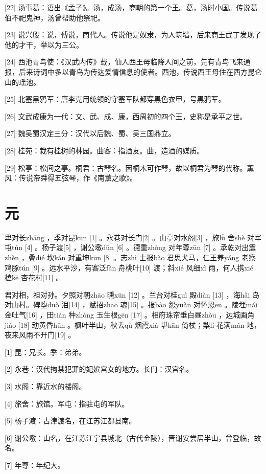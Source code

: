 \documentclass[12pt,UTF8]{ctexbook}
\begin{document}
[22] 汤事葛：语出《孟子》。汤，成汤，商朝的第一个王。葛，汤时小国。传说葛伯不祀鬼神，汤曾帮助他祭祀。

[23] 说兴殷：说，傅说，商代人。传说他是奴隶，为人筑墙，后来商王武丁发现了他的才干，举以为三公。

[24] 西池青鸟使：《汉武内传》载，仙人西王母临降人间之前，先有青鸟飞来通报，后来诗词中多以青鸟为传达爱情信息的使者。西池，传说西王母住在西方昆仑山的瑶池。

[25] 北塞黑鸦军：唐李克用统领的守塞军队都穿黑色衣甲，号黑鸦军。

[26] 文武成康为一代：文、武、成、康，西周初的四个王，史称是承平之世。

[27] 魏吴蜀汉定三分：汉代以后魏、蜀、吴三国鼎立。

[28] 桂苑：栽有桂树的林园。曲客：指酒友。曲，造酒的媒质。

[29] 松亭：松间之亭。桐君：古琴名。因桐木可作琴，故以桐君为琴的代称。薰风：传说帝舜得五弦琴，作《南薰之歌》。





\chapter{元}


卑对长zhǎng ，季对昆kūn [1] 。永巷对长门[2] 。山亭对水阁[3] ，旅lǚ 舍shè 对军屯tún [4] 。杨子渡[5] ，谢公墩dūn [6] 。德重zhòng 对年尊zūn [7] 。承乾对出震zhèn ，叠dié 坎kǎn 对重坤kūn [8] 。志zhì 士报bào 君思犬马，仁王养yǎng 老察鸡豚tún [9] 。远水平沙，有客泛fàn 舟桃叶[10] 渡；斜xié 风细xì 雨，何人携xié 榼kē 杏花村[11] 。

君对相，祖对孙。夕照对朝zhāo 曛xūn [12] 。兰台对桂guì 殿diàn [13] ，海hǎi 岛对山村。碑堕duò 泪[14] ，赋招zhāo 魂[15] 。报bào 怨yuàn 对怀恩ēn 。陵埋mái 金吐气[16] ，田tián 种zhòng 玉生根gēn [17] 。相府珠帘垂白昼zhòu ，边城画角jiǎo [18] 动黄昏hūn 。枫叶半山，秋去qù 烟霞xiá 堪kān 倚杖；梨lí 花满mǎn 地，夜来风雨不开门[19] 。


[1] 昆：兄长。季：弟弟。

[2] 永巷：汉代拘禁犯罪的妃嫔宫女的地方。长门：汉宫名。

[3] 水阁：靠近水的楼阁。

[4] 旅舍：旅馆。军屯：指驻屯的军队。

[5] 杨子渡：古津渡名，在江苏江都县南。

[6] 谢公墩：山名，在江苏江宁县城北（古代金陵），晋谢安尝居半山，曾登临，故名。

[7] 年尊：年纪大。
\end{document}
